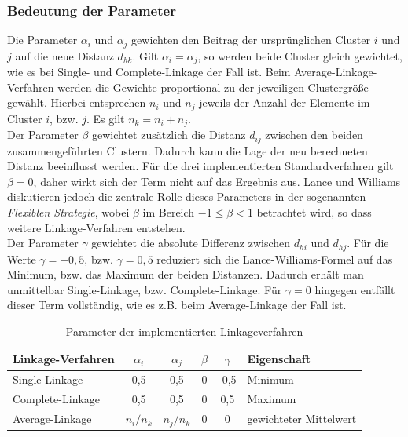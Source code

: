 \documentclass[12pt]{article}
\begin{document}
\subsubsection{Bedeutung der Parameter}
\label{lw-parameter}
Die Parameter $\alpha_i$ und $\alpha_j$ gewichten den Beitrag der ursprünglichen Cluster $i$ und $j$ auf die neue Distanz $d_{hk}$. Gilt $\alpha_i = \alpha_j$, so werden beide Cluster gleich gewichtet, wie es bei Single- und Complete-Linkage der Fall ist. Beim Average-Linkage-Verfahren werden die Gewichte proportional zu der jeweiligen Clustergröße gewählt. Hierbei entsprechen $n_i$ und $n_j$ jeweils der Anzahl der Elemente im Cluster $i$, bzw. $j$. Es gilt $n_k = n_i + n_j$.\\
Der Parameter $\beta$ gewichtet zusätzlich die Distanz $d_{ij}$ zwischen den beiden zusammengeführten Clustern. Dadurch kann die Lage der neu berechneten Distanz beeinflusst werden. Für die drei implementierten Standardverfahren gilt $\beta = 0$, daher wirkt sich der Term nicht auf das Ergebnis aus. Lance und Williams diskutieren jedoch die zentrale Rolle dieses Parameters in der sogenannten \textit{Flexiblen Strategie}, wobei $\beta$ im Bereich $ -1 \le \beta < 1$ betrachtet wird, so dass weitere Linkage-Verfahren entstehen.\\
Der Parameter $\gamma$ gewichtet die absolute Differenz zwischen $d_{hi}$ und $d_{hj}$. Für die Werte $\gamma = -0,5$, bzw. $\gamma = 0,5$ reduziert sich die Lance-Williams-Formel auf das Minimum, bzw. das Maximum der beiden Distanzen. Dadurch erhält man unmittelbar Single-Linkage, bzw. Complete-Linkage. Für $\gamma = 0$ hingegen entfällt dieser Term vollständig, wie es z.B. beim Average-Linkage der Fall ist. 

\begin{table}[ht]
	\centering
	\renewcommand{\arraystretch}{1.3}
	\begin{tabularx}{\textwidth}{lccccX}
		\toprule
		Linkage-Verfahren & $\alpha_i$ & $\alpha_j$ & $\beta$ & $\gamma$ & Eigenschaft \\
		\midrule
		Single-Linkage    & 0,5 	   & 0,5        & 0       & -0,5     & Minimum  \\
		Complete-Linkage  & 0,5 	   & 0,5        & 0       &  0,5     & Maximum  \\
		Average-Linkage   & $n_i/n_k$  & $n_j/n_k$  & 0       &  0       & gewichteter Mittelwert\\
		\bottomrule
	\end{tabularx}
	\caption{Parameter der implementierten Linkageverfahren}
	\label{linkage-parameter}
\end{table}
\end{document}
